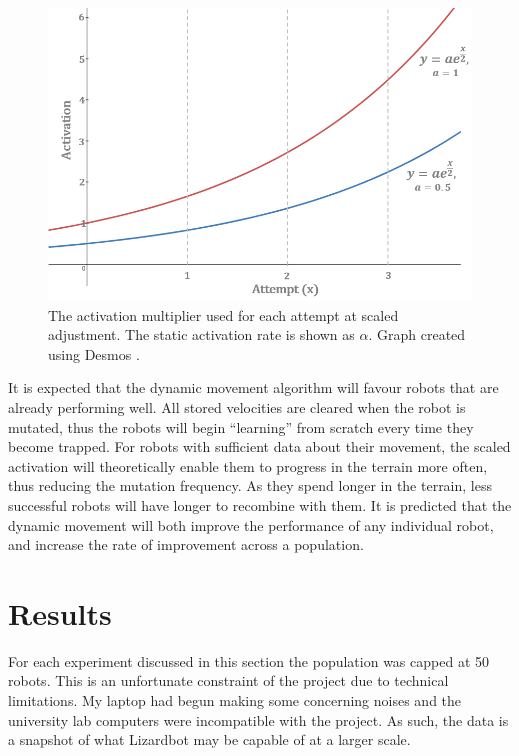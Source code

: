 \documentclass{article}
\begin{document}
\begin{enumerate}
\begin{figure}[H]
\centering
\includegraphics[scale=0.6]{activationFunction}
\caption{The activation multiplier used for each attempt at scaled adjustment. The static activation rate is shown as $\alpha$. Graph created using Desmos \citep{graphs}.}
\end{figure}
\end{enumerate}

It is expected that the dynamic movement algorithm will favour robots that are already performing well. All stored velocities are cleared when the robot is mutated, thus the robots will begin “learning” from scratch every time they become trapped. For robots with sufficient data about their movement, the scaled activation will theoretically enable them to progress in the terrain more often, thus reducing the mutation frequency. As they spend longer in the terrain, less successful robots will have longer to recombine with them. It is predicted that the dynamic movement will both improve the performance of any individual robot, and increase the rate of improvement across a population. \\

\newpage
\section{Results}
\label{sec:Results}
For each experiment discussed in this section the population was capped at 50 robots. This is an unfortunate constraint of the project due to technical limitations. My laptop had begun making some concerning noises and the university lab computers were incompatible with the project. As such, the data is a snapshot of what Lizardbot may be capable of at a larger scale.\\
\end{document}
